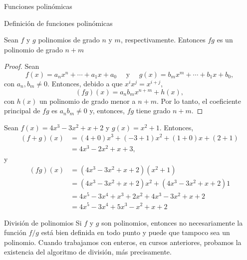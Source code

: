 \begin{chapter}{Funciones polin\'omicas}
\begin{section}{Definici\'on de funciones polin\'omicas}
        \begin{proposicion}
            Sean $f$ y $g$ polinomios de grado $n$ y $m$,  respectivamente. Entonces $fg$ es un  polinomio de grado $n+m$
        \end{proposicion}
        \begin{proof}
            Sean 
            \begin{equation*}
            f(x) = a_nx^n + \cdots + a_1x +a_0 \quad\text{ y } \quad g(x) = b_mx^m +\cdots + b_1x +b_0,
            \end{equation*}
            con $a_n, b_m \ne 0$. Entonces, debido a que $x^ix^j = x^{i+j}$, 
            \begin{equation}
                (fg)(x) = a_nb_m x^{n+m} + h(x),
             \end{equation}
            con $h(x)$ un polinomio de grado menor a $n+m$. Por lo tanto, el coeficiente principal de $fg$ es $a_nb_m \ne 0$ y,  entonces, $fg$ tiene grado $n+m$.
        \end{proof}
    
        
            
        \begin{ejemplo*} Sean $f(x) = 4x^3 - 3x^2 + x + 2$ y $g(x) = x^2 + 1$. Entonces,
            \begin{align*}
                (f+g)(x) &= (4+0)x^3 +(-3 +1)x^2 + (1+0)x + (2+1)\\
                &= 4x^3 - 2x^2 + x + 3,
            \end{align*}
            y
            \begin{align*}
            (fg)(x) &= (4x^3 - 3x^2 + x + 2)(x^2 + 1)\\
            &= (4x^3 - 3x^2 + x + 2)x^2 + (4x^3 - 3x^2 + x + 2)1\\
            &= 4x^5 - 3x^4 + x^3 + 2x^2 + 4x^3 - 3x^2 + x + 2 \\
            &= 4x^5 - 3x^4 + 5x^3 - x^2 + x + 2
            \end{align*}
        \end{ejemplo*}
        
    
        \end{section}
    
        \begin{section}{Divisi\'on de polinomios}\label{seccion-division-de-polinomios} Si $f$ y $g$ son polinomios,  entonces no necesariamente la función $f/g$ está bien definida en todo punto y puede que tampoco sea un polinomio. Cuando trabajamos con enteros, en cursos anteriores,  probamos la existencia del algoritmo de división, más precisamente.
            

\end{section}
\end{chapter}
